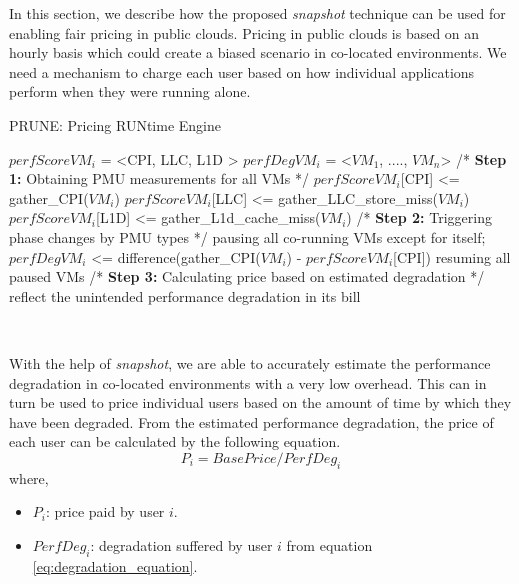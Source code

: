 \documentclass{sig-alternate}
\begin{document}
In this section, we describe how the proposed \textit{snapshot} technique can be used for enabling fair pricing in public clouds. Pricing in public clouds is based on an hourly basis which could create a biased scenario in co-located environments. We need a mechanism to charge each user based on how individual applications perform when they were running alone. 
\begin{algorithm}[!tb]
\caption{PRUNE: Pricing RUNtime Engine }
\label{alg:fpalgo}
\begin{algorithmic}
\begin{small}
\State $perfScoreVM_{i}$ = <CPI, LLC, L1D >\;
\State $perfDegVM_{i}$ = <$VM_{1}$, ...., $VM_{n}$> 
\State
\State /* \textbf{Step 1:} Obtaining PMU measurements for all VMs */
\State $perfScoreVM_{i}$[CPI] <= gather\_CPI($VM_{i}$) 
\State $perfScoreVM_{i}$[LLC] <= gather\_LLC\_store\_miss($VM_{i}$)
\State $perfScoreVM_{i}$[L1D] <= gather\_L1d\_cache\_miss($VM_{i}$)
\EndFor 
\State
\State /* \textbf{Step 2:} Triggering phase changes by PMU types */
\State pausing all co-running VMs except for itself;
\State $perfDegVM_{i}$ <= difference(gather\_CPI($VM_{i}$) - $perfScoreVM_{i}$[CPI])
\State resuming all paused VMs
\EndIf
\EndFor 
\EndFor 
\State
\State /* \textbf{Step 3:} Calculating price based on estimated degradation */
\State reflect the unintended performance degradation in its bill
\EndIf
\EndFor 
\end{small}\
\end{algorithmic}
\end{algorithm}

With the help of \textit{snapshot}, we are able to accurately estimate the performance degradation in co-located environments with a very low overhead. This can in turn be used to price individual users based on the amount of time by which they have been degraded. From the estimated performance degradation, the price of each user can be calculated by the following equation. 
\begin{equation} \label{price}
P_{i} = BasePrice/PerfDeg_{i}
\end{equation}
where,
\begin{itemize}
\item $P_{i}$: price paid by user $i$.
\item $PerfDeg_{i}$: degradation suffered by user $i$ from equation \ref{eq:degradation_equation}.
\end{itemize}
\end{document}
